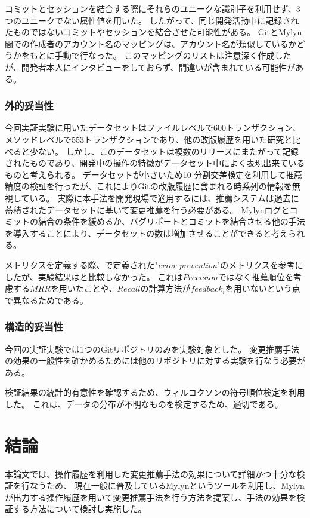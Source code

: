 \documentclass[a4paper]{jsbook}
\begin{document}
コミットとセッションを結合する際にそれらのユニークな識別子を利用せず、3つのユニークでない属性値を用いた。
したがって、同じ開発活動中に記録されたものではないコミットやセッションを結合させた可能性がある。
GitとMylyn間での作成者のアカウント名のマッピングは、アカウント名が類似しているかどうかをもとに手動で行なった。
このマッピングのリストは注意深く作成したが、開発者本人にインタビューをしておらず、間違いが含まれている可能性がある。


\subsection{外的妥当性}
今回実証実験に用いたデータセットはファイルレベルで600トランザクション、メソッドレベルで553トランザクションであり、他の改版履歴を用いた研究と比べると少ない。
しかし、このデータセットは複数のリリースにまたがって記録されたものであり、開発中の操作の特徴がデータセット中によく表現出来ているものと考えられる。
データセットが小さいため10-分割交差検定を利用して推薦精度の検証を行ったが、これによりGitの改版履歴に含まれる時系列の情報を無視している。
実際に本手法を開発現場で適用するには、推薦システムは過去に蓄積されたデータセットに基いて変更推薦を行う必要がある。
Mylynログとコミットの結合の条件を緩めるか、バグリポートとコミットを結合させる他の手法を導入することにより、データセットの数は増加させることができると考えられる。

メトリクスを定義する際、\cite{Zimmermann:2005}で定義された"{\it error prevention}"のメトリクスを参考にしたが、実験結果は\cite{Zimmermann:2005}と比較しなかった。
これは$Precision$ではなく推薦順位を考慮する$MRR$を用いたことや、$Recall$の計算方法が$feedback_i$を用いないという点で異なるためである。


\subsection{構造的妥当性}
今回の実証実験では1つのGitリポジトリのみを実験対象とした。
変更推薦手法の効果の一般性を確かめるためには他のリポジトリに対する実験を行なう必要がある。

検証結果の統計的有意性を確認するため、ウィルコクソンの符号順位検定を利用した。
これは、データの分布が不明なものを検定するため、適切である。
\chapter{結論}\label{conclusion_chap}
本論文では、操作履歴を利用した変更推薦手法の効果について詳細かつ十分な検証を行なうため、
現在一般に普及しているMylynというツールを利用し、Mylynが出力する操作履歴を用いて変更推薦手法を行う方法を提案し、手法の効果を検証する方法について検討し実施した。
\end{document}
